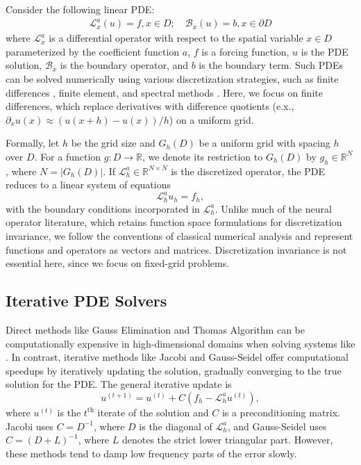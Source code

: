 \documentclass{article}
\begin{document}
Consider the following linear PDE:
\begin{equation} \label{eq:mainpde}
    \begin{split}
    \mathcal{L}_{x}^a\left(u\right) = f ,x \in D; \quad
    \mathcal{B}_{x}\left(u\right) = b ,x \in \partial D
    \end{split}
\end{equation}
where $\mathcal{L}_x^a$ is a differential operator with respect to the spatial variable $x \in D$ parameterized by the coefficient function $a$,  $f$ is a forcing function,  $u$ is the PDE solution, $\mathcal{B}_{x}$ is the boundary operator, and $b$ is the boundary term. Such PDEs can be solved numerically using various discretization strategies, such as finite differences \citep{smith1985numerical,leveque2007finite}, finite element, and spectral methods \citep{boyd2001chebyshev,canuto2006spectral}. Here, we focus on finite differences, which replace derivatives with difference quotients (e.x., $\partial_x u(x) \approx (u(x + h) - u(x))/h$) on a uniform grid.

Formally, let $h$ be the grid size and $G_h(D)$ be a uniform grid with spacing $h$ over $D$. For a function $g: D \to \mathbb{R}$, we denote its restriction to $G_h(D)$ by $g_h \in \mathbb{R}^N$,
where $N = |G_h(D)|$. If $\mathcal{L}_h^a \in \mathbb{R}^{N \times N}$ is the discretized operator, the PDE reduces to a linear system of equations
\begin{equation} \label{eq:mainpdediscrete}
    \mathcal{L}_h^au_h = f_h,
\end{equation}
with the boundary conditions incorporated in $\mathcal{L}_h^a$. Unlike much of the neural operator literature, which retains function space formulations for discretization invariance, we follow the conventions of classical numerical analysis and represent functions and operators as vectors and matrices. Discretization invariance is not essential here, since we focus on fixed-grid problems.

\subsection{Iterative PDE Solvers} \label{sec:finitedifference}
Direct methods like Gauss Elimination and Thomas Algorithm can be computationally expensive in high-dimensional domains when solving systems like . In contrast, iterative methods like Jacobi and Gauss-Seidel offer computational speedups by iteratively updating the solution, gradually converging to the true solution for the PDE. The general iterative update is
\begin{equation}\label{eq:iterativeupdate}
    u^{(t + 1)} = u^{(t)} + C\left(f_h - \mathcal{L}_h^au^{(t)}\right),
\end{equation}
where $u^{(t)}$ is the $t^{\text{th}}$ iterate of the solution and $C$ is a preconditioning matrix. Jacobi uses $C = D^{-1}$, where $D$ is the diagonal of $\mathcal{L}_h^a$, and Gauss-Seidel uses $C = (D + L)^{-1}$, where $L$ denotes the strict lower triangular part. 
However, these methods tend to damp low frequency parts of the error slowly. 
\end{document}
